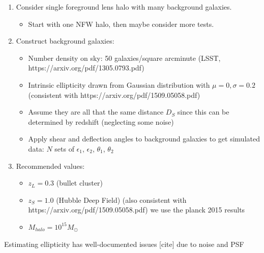 \documentclass[10pt]{article}
\begin{document}
\begin{enumerate}
    \item Consider single foreground lens halo with many background galaxies.
    \begin{itemize}
        \item Start with one NFW halo, then maybe consider more tests.
    \end{itemize}
    \item Construct background galaxies:
    \begin{itemize}
        \item Number density on sky: 50 galaxies/square arcminute (LSST, https://arxiv.org/pdf/1305.0793.pdf)
        \item Intrinsic ellipticity drawn from Gaussian distribution with $\mu=0, \sigma=0.2$ (consistent with https://arxiv.org/pdf/1509.05058.pdf)
        \item Assume they are all that the same distance $D_S$ since this can be determined by redshift (neglecting some noise)
        \item Apply shear and deflection angles to background galaxies to get simulated data: $N$ sets of $\epsilon_1$, $\epsilon_2$, $\theta_1$, $\theta_2$
    \end{itemize}
    \item Recommended values:
    \begin{itemize}
        \item $z_L = 0.3$ (bullet cluster)
        \item $z_S = 1.0$ (Hubble Deep Field) (also consistent with https://arxiv.org/pdf/1509.05058.pdf)
        we use the planck 2015 results
        \item $M_{halo} = 10^{15} M_\odot$
    \end{itemize}
\end{enumerate}

Estimating ellipticity has well-documented issues [cite] due to noise and PSF
\end{document}
